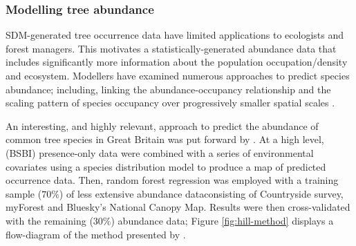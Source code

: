 \subsubsection{Modelling tree abundance}

SDM-generated tree occurrence data have limited applications to ecologists and forest managers.
This motivates a statistically-generated abundance data that includes significantly 
more information about the population occupation/density and ecosystem.
Modellers have examined numerous approaches to predict species abundance;
including, linking the abundance-occupancy relationship \cite{gaston2000abundance} and
the scaling pattern of species occupancy over progressively smaller spatial scales \cite{hui2009extrapolating}.

An interesting, and highly relevant, approach to predict the abundance of common tree species in Great Britain was put forward by \cite{hill.data}.
At a high level, (BSBI) presence-only data were combined with a series of environmental covariates using a species distribution model to 
produce a map of predicted occurrence data. Then, random forest regression was employed with a training sample ($70\%$) of less extensive abundance 
data\textemdash consisting of Countryside survey, myForest and Bluesky's National Canopy Map. 
Results were then cross-validated with the remaining ($30\%$) abundance data; Figure \ref{fig:hill-method} displays a
flow-diagram of the method presented by \cite{hill.data}. 

